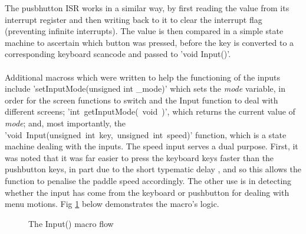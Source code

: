 \documentclass[a4paper,12pt]{article}
\begin{document}
\begin{flushleft}
The pusbhutton ISR works in a similar way, by first reading the value from its interrupt register and then writing back to it to clear the interrupt flag (preventing infinite interrupts). The value is then compared in a simple state machine to ascertain which button was pressed, before the key is converted to a corresponding keyboard scancode and passed to 'void Input()'. 
\\ \- \\
Additional macross which were written to help the functioning of the inputs include 'setInputMode(unsigned int \_mode)' which sets the \textit{mode} variable, in order for the screen functions to switch and the Input function to deal with different screens; \mbox{'int getInputMode( void )'}, which returns the current value of \textit{mode}; and, most importantly, the \mbox{'void Input(unsigned int key, unsigned int speed)'} function, which is a state machine dealing with the inputs. The speed input serves a dual purpose. First, it was noted that it was far easier to press the keyboard keys faster than the pushbutton keys, in part due to the short typematic delay \cite{altium_ps2}, and so this allows the function to penalise the paddle speed accordingly. The other use is in detecting whether the input has come from the keyboard or pushbutton for dealing with menu motions. Fig \ref{fig:inSM} below demonstrates the macro's logic.

\begin{figure}[H]
	\centering
	\caption{The Input() macro flow \label{fig:inSM}} 
\end{figure}
\- \\

\end{flushleft}
	
\end{document}

